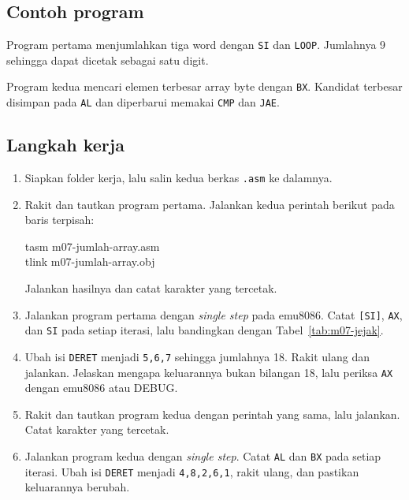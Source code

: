 \subsection{Contoh program}

Program pertama menjumlahkan tiga word dengan \texttt{SI} dan
\texttt{LOOP}. Jumlahnya 9 sehingga dapat dicetak sebagai satu digit.



Program kedua mencari elemen terbesar array byte dengan \texttt{BX}.
Kandidat terbesar disimpan pada \texttt{AL} dan diperbarui memakai
\texttt{CMP} dan \texttt{JAE}.



\subsection{Langkah kerja}

\begin{enumerate}
    \item Siapkan folder kerja, lalu salin kedua berkas \texttt{.asm}
          ke dalamnya.
    \item Rakit dan tautkan program pertama. Jalankan kedua perintah
          berikut pada baris terpisah:
          \begin{perintah}
tasm m07-jumlah-array.asm\\
tlink m07-jumlah-array.obj
\end{perintah}
          Jalankan hasilnya dan catat karakter yang tercetak.
    \item Jalankan program pertama dengan \emph{single step} pada
          emu8086. Catat \texttt{[SI]}, \texttt{AX}, dan \texttt{SI}
          pada setiap iterasi, lalu bandingkan dengan
          Tabel~\ref{tab:m07-jejak}.
    \item Ubah isi \texttt{DERET} menjadi \texttt{5,6,7} sehingga
          jumlahnya 18. Rakit ulang dan jalankan. Jelaskan mengapa
          keluarannya bukan bilangan 18, lalu periksa \texttt{AX}
          dengan emu8086 atau DEBUG.
    \item Rakit dan tautkan program kedua dengan perintah yang sama,
          lalu jalankan. Catat karakter yang tercetak.
    \item Jalankan program kedua dengan \emph{single step}. Catat
          \texttt{AL} dan \texttt{BX} pada setiap iterasi. Ubah isi
          \texttt{DERET} menjadi \texttt{4,8,2,6,1}, rakit ulang, dan
          pastikan keluarannya berubah.
\end{enumerate}

